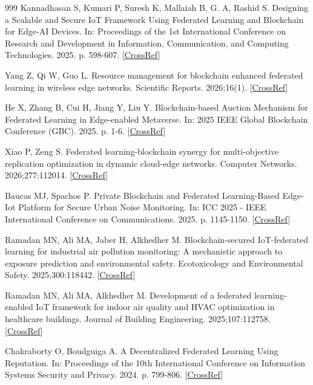 \documentclass[cmc,article,submit,moreauthors,pdftex]{Definitions/tsp}
\begin{document}
\begin{thebibliography}{999}
Kannadhasan S, Kumari P, Suresh K, Mallaiah B, G. A, Rashid S. Designing a Scalable and Secure IoT Framework Using Federated Learning and Blockchain for Edge-AI Devices. In: Proceedings of the 1st International Conference on Research and Development in Information, Communication, and Computing Technologies. 2025. p. 598-607. [\href{https://doi.org/10.5220/0013870100004919}{CrossRef}]

Yang Z, Qi W, Guo L. Resource management for blockchain enhanced federated learning in wireless edge networks. Scientific Reports. 2026;16(1). [\href{https://doi.org/10.1038/s41598-026-56310-1}{CrossRef}]

He X, Zhang B, Cui H, Jiang Y, Liu Y. Blockchain-based Auction Mechanism for Federated Learning in Edge-enabled Metaverse. In: 2025 IEEE Global Blockchain Conference (GBC). 2025. p. 1-6. [\href{https://doi.org/10.1109/gbc60041.2025.11134466}{CrossRef}]

Xiao P, Zeng S. Federated learning-blockchain synergy for multi-objective replication optimization in dynamic cloud-edge networks. Computer Networks. 2026;277:112014. [\href{https://doi.org/10.1016/j.comnet.2026.112014}{CrossRef}]

Baucas MJ, Spachos P. Private Blockchain and Federated Learning-Based Edge-Iot Platform for Secure Urban Noise Monitoring. In: ICC 2025 - IEEE International Conference on Communications. 2025. p. 1145-1150. [\href{https://doi.org/10.1109/icc52391.2025.11160895}{CrossRef}]

Ramadan MN, Ali MA, Jaber H, Alkhedher M. Blockchain-secured IoT-federated learning for industrial air pollution monitoring: A mechanistic approach to exposure prediction and environmental safety. Ecotoxicology and Environmental Safety. 2025;300:118442. [\href{https://doi.org/10.1016/j.ecoenv.2025.118442}{CrossRef}]

Ramadan MN, Ali MA, Alkhedher M. Development of a federated learning-enabled IoT framework for indoor air quality and HVAC optimization in healthcare buildings. Journal of Building Engineering. 2025;107:112758. [\href{https://doi.org/10.1016/j.jobe.2025.112758}{CrossRef}]

Chakraborty O, Boudguiga A. A Decentralized Federated Learning Using Reputation. In: Proceedings of the 10th International Conference on Information Systems Security and Privacy. 2024. p. 799-806. [\href{https://doi.org/10.5220/0012428300003648}{CrossRef}]


\end{thebibliography}
\end{document}
